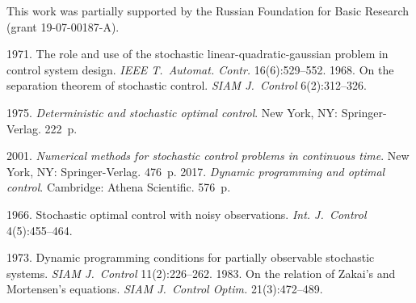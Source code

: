       
      




 \Ack
      \noindent
      This work was partially supported by the Russian Foundation for Basic Research 
 (grant 19-07-00187-A).

\vspace*{12pt}

  \begin{multicols}{2}

\renewcommand{\bibname}{\protect\rmfamily References}

{\small\frenchspacing
 {%
 \begin{thebibliography}{99}

       1971. The role and use of the stochastic linear-quadratic-gaussian problem in 
control system design. \textit{IEEE T.~Automat. Contr.} 16(6):529--552.
       1968. On the separation theorem of stochastic control. \textit{SIAM 
J.~Control} 6(2):312--326.

       1975. \textit{Deterministic and stochastic optimal 
control}. New York, NY: Springer-Verlag. 222~p.

       2001. \textit{Numerical methods for stochastic control 
problems in continuous time}. New York, NY: Springer-Verlag. 476~p.
       2017. \textit{Dynamic programming and optimal control}. Cambridge: 
Athena Scientific. 576~p.

       1966. Stochastic optimal control with noisy observations. \textit{Int. 
J.~Control} 4(5):455--464.

      
       1973. Dynamic programming conditions for 
partially observable stochastic systems. \textit{SIAM J.~Control} 11(2):226--262.
       1983. On the relation of Zakai's and Mortensen's 
equations. \textit{SIAM J.~Control Optim.} 21(3):472--489.


\end{thebibliography}}}
\end{multicols}
